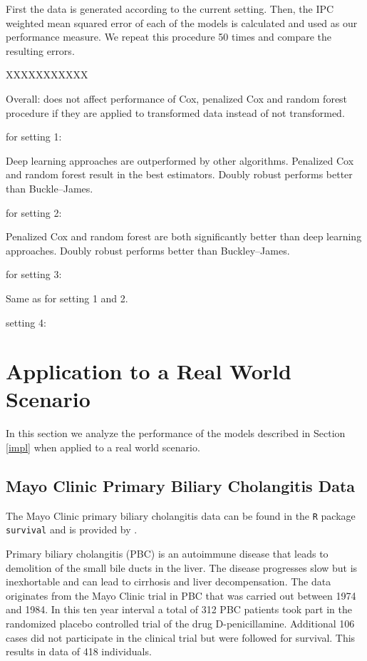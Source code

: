 \documentclass[12pt, a4paper]{scrartcl}
\theoremstyle{definition}
\theoremstyle{plain}
\numberwithin{equation}{section}
\numberwithin{figure}{section}
\numberwithin{table}{section}
\begin{document}
	First the data is generated according to the current setting.
	Then, the IPC weighted mean squared error of each of the models is calculated and used as our performance measure.
	We repeat this procedure 50 times and compare the resulting errors.
	
	XXXXXXXXXXX
	
	Overall: does not affect performance of Cox, penalized Cox and random forest procedure if they are applied to transformed data instead of not transformed.
	
	for setting 1:
	
	Deep learning approaches are outperformed by other algorithms.
	Penalized Cox and random forest result in the best estimators.
	Doubly robust performs better than Buckle--James.
	
	for setting 2:
	
	Penalized Cox and random forest are both significantly better than deep learning approaches.
	Doubly robust performs better than Buckley--James.
	
	for setting 3:
	
	Same as for setting 1 and 2.
	
	setting 4:
	
	
	\newpage
	\section{Application to a Real World Scenario}
	In this section we analyze the performance of the models described in Section \ref{impl} when applied to a real world scenario.
	
	\subsection{Mayo Clinic Primary Biliary Cholangitis Data}
	The Mayo Clinic primary biliary cholangitis data can be found in the \texttt{R} package \texttt{survival} and is provided by \citet*{survival-book}.
	
	Primary biliary cholangitis (PBC) is an autoimmune disease that leads to demolition of the small bile ducts in the liver.
	The disease progresses slow but is inexhortable and can lead to cirrhosis and liver decompensation.
	The data originates from the Mayo Clinic trial in PBC that was carried out between 1974 and 1984.
	In this ten year interval a total of 312 PBC patients took part in the randomized placebo controlled trial of the drug D-penicillamine.
	Additional 106 cases did not participate in the clinical trial but were followed for survival.
	This results in data of 418 individuals.
	
\end{document}

